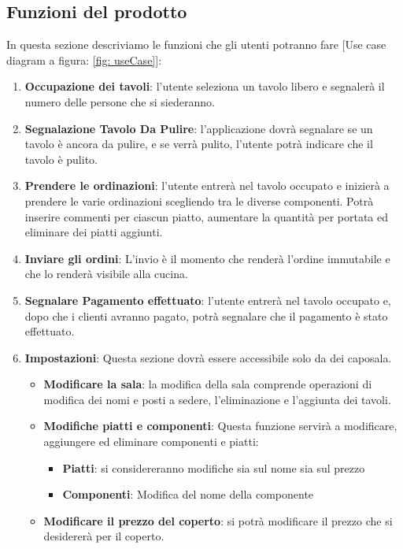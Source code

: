\documentclass[12pt, letterpaper]{book}
\begin{document}
\subsection{Funzioni del prodotto}
In questa sezione descriviamo le funzioni che gli utenti potranno fare [Use case diagram a figura: \ref{fig: useCase}]:
\begin{enumerate}


    \item \textbf{Occupazione dei tavoli}: l'utente seleziona un tavolo libero e segnalerà il numero delle persone che si siederanno.
    \item \textbf{Segnalazione Tavolo Da Pulire}: l'applicazione dovrà segnalare se un tavolo è ancora da pulire, e se verrà pulito, l'utente potrà indicare che il tavolo è pulito.
    \item \textbf{Prendere le ordinazioni}: l'utente entrerà nel tavolo occupato e inizierà a prendere le varie ordinazioni scegliendo tra le diverse componenti. Potrà inserire commenti per ciascun piatto, aumentare la quantità per portata ed eliminare dei piatti aggiunti.
    \item \textbf{Inviare gli ordini}: L'invio è il momento che renderà l'ordine immutabile e che lo renderà visibile alla cucina.
    \item \textbf{Segnalare Pagamento effettuato}: l'utente entrerà nel tavolo occupato e, dopo che i clienti avranno pagato, potrà segnalare che il pagamento è stato effettuato.
    \item \textbf{Impostazioni}: Questa sezione dovrà essere accessibile solo da dei caposala.
          \begin{itemize}
              \item \textbf{Modificare la sala}: la modifica della sala comprende operazioni di modifica dei nomi e posti a sedere, l'eliminazione e l'aggiunta dei tavoli.
              \item \textbf{Modifiche piatti e componenti}: Questa funzione servirà a modificare, aggiungere ed eliminare componenti e piatti:
              \begin{itemize}
                \item \textbf{Piatti}: si considereranno modifiche sia sul nome sia sul prezzo
                \item \textbf{Componenti}: Modifica del nome della componente 
              \end{itemize}
              \item \textbf{Modificare il prezzo del coperto}: si potrà modificare il prezzo che si desidererà per il coperto.
          \end{itemize}
\end{enumerate}
\end{document}
